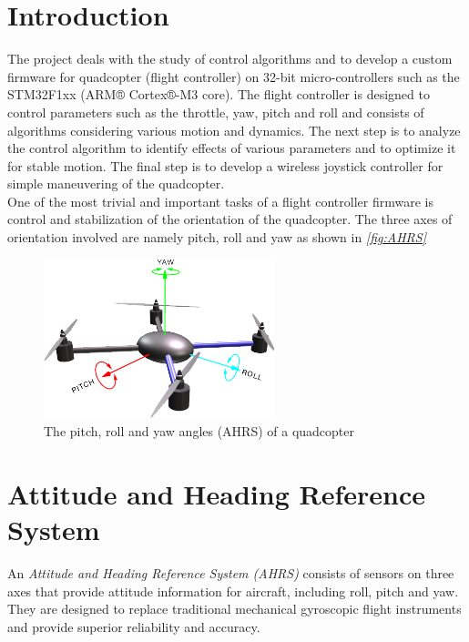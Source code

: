 \documentclass[a4paper,12pt,oneside]{book}
\begin{document}
\section{Introduction}
The project deals with the study of control algorithms and to develop a custom firmware for quadcopter (flight controller) on 32-bit micro-controllers such as the STM32F1xx (ARM® Cortex®-M3 core). The flight controller is designed to control parameters such as the throttle, yaw, pitch and roll and consists of algorithms considering various motion and dynamics. The next step is to analyze the control algorithm to identify effects of various parameters and to optimize it for stable motion. The final step is to develop a wireless joystick controller for simple maneuvering of the quadcopter.\\ 

One of the most trivial and important tasks of a flight controller firmware is control and stabilization of the orientation of the quadcopter. The three axes of orientation involved are namely pitch, roll and yaw as shown in \textit{\autoref{fig:AHRS}}\\

\begin{figure}[!htb]
\centering
\includegraphics[width=0.6\textwidth]{images/AHRS}
\caption{The pitch, roll and yaw angles (AHRS) of a quadcopter\cite{ardu}}
\label{fig:AHRS}
\end{figure}

\section{Attitude and Heading Reference System}
An \textit{Attitude and Heading Reference System (AHRS)} consists of sensors on three axes that provide attitude information for aircraft, including roll, pitch and yaw. They are designed to replace traditional mechanical gyroscopic flight instruments and provide superior reliability and accuracy.\cite{ahrswiki}\\
\end{document}

